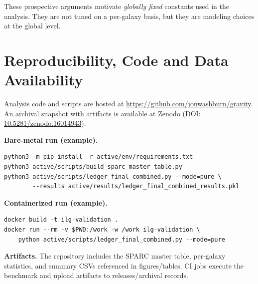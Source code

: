 \documentclass[12pt,a4paper]{article}
\begin{document}
These prospective arguments motivate \emph{globally fixed} constants used in the analysis. They are not tuned on a per-galaxy basis, but they are modeling choices at the global level.

\section*{Reproducibility, Code and Data Availability}
\noindent
Analysis code and scripts are hosted at \href{https://github.com/jonwashburn/gravity}{https://github.com/jonwashburn/gravity}. An archival snapshot with artifacts is available at Zenodo (DOI: \href{https://doi.org/10.5281/zenodo.16014943}{10.5281/zenodo.16014943}).

\noindent\textbf{Bare-metal run (example).}
\begin{verbatim}
python3 -m pip install -r active/env/requirements.txt
python3 active/scripts/build_sparc_master_table.py
python3 active/scripts/ledger_final_combined.py --mode=pure \
        --results active/results/ledger_final_combined_results.pkl
\end{verbatim}

\noindent\textbf{Containerized run (example).}
\begin{verbatim}
docker build -t ilg-validation .
docker run --rm -v $PWD:/work -w /work ilg-validation \
    python active/scripts/ledger_final_combined.py --mode=pure
\end{verbatim}

\noindent\textbf{Artifacts.} The repository includes the SPARC master table, per-galaxy statistics, and summary CSVs referenced in figures/tables. CI jobs execute the benchmark and upload artifacts to releases/archival records.
\end{document}
